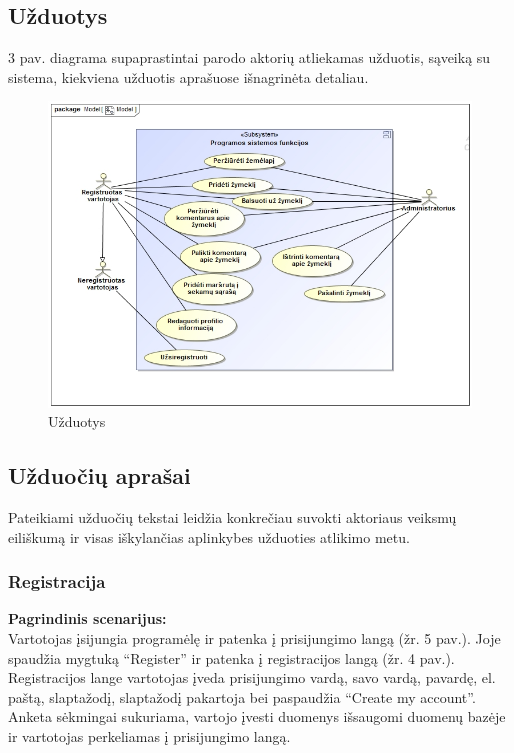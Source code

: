 \documentclass{VUMIFPSkursinis}
\begin{document}
\subsection{Užduotys}
3 pav. diagrama supaprastintai parodo aktorių atliekamas užduotis, sąveiką su sistema, kiekviena užduotis aprašuose išnagrinėta detaliau.
	\begin{figure}[H]
				\centering
				\includegraphics[scale=0.5]{img/uzduotys}
				\caption{Užduotys}
				\label{img:uzduotys}
			\end{figure}

\subsection{Užduočių aprašai}
Pateikiami užduočių tekstai leidžia konkrečiau suvokti aktoriaus veiksmų eiliškumą ir visas iškylančias aplinkybes užduoties atlikimo metu.
\subsubsection{Registracija}
	\textbf{Pagrindinis scenarijus:}\\
	Vartotojas įsijungia programėlę ir patenka į prisijungimo langą (žr. 5 pav.). Joje spaudžia mygtuką “Register” ir patenka į registracijos langą (žr. 4 pav.). 
	Registracijos lange vartotojas įveda prisijungimo vardą, savo vardą, pavardę, el. paštą, slaptažodį, slaptažodį pakartoja bei paspaudžia 
	“Create my account”. Anketa sėkmingai sukuriama, vartojo įvesti duomenys išsaugomi duomenų bazėje ir vartotojas perkeliamas į prisijungimo langą.
\end{document}
